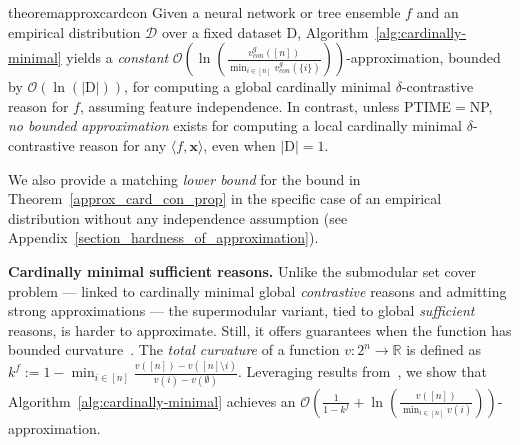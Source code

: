 \documentclass{article}
\newtheorem{theorem}{Theorem}
\newcommand{\x}{\textbf{x}}
\begin{document}


\begin{restatable}{theorem}{approxcardcon}\label{approx_card_con_prop}
Given a neural network or tree ensemble $f$ and an empirical distribution $\mathcal{D}$ over a fixed dataset $\text{D}$, Algorithm~\ref{alg:cardinally-minimal} yields a \emph{constant} $\mathcal{O}\left(\ln\left(\frac{v^g_{con}([n])}{\min_{i \in [n]} v^g_{con}(\{i\})}\right)\right)$-approximation, bounded by $\mathcal{O}(\ln(|\text{D}|))$, for computing a global cardinally minimal $\delta$-contrastive reason for $f$, assuming feature independence. In contrast, unless PTIME$=$NP, \emph{no bounded approximation} exists for computing a local cardinally minimal $\delta$-contrastive reason for any $\langle f,\x\rangle$, even when $|\text{D}| = 1$.
\end{restatable}

We also provide a matching \emph{lower bound} for the bound in Theorem~\ref{approx_card_con_prop} in the specific case of an empirical distribution without any independence assumption (see Appendix~\ref{section_hardness_of_approximation}).

\textbf{Cardinally minimal sufficient reasons.} Unlike the submodular set cover problem --- linked to cardinally minimal global \emph{contrastive} reasons and admitting strong approximations --- the supermodular variant, tied to global \emph{sufficient} reasons, is harder to approximate. Still, it offers guarantees when the function has bounded curvature~\citep{shi2021minimum}. The \emph{total curvature} of a function $v:2^{n}\to \mathbb{R}$ is defined as $k^f := 1 - \min_{i \in [n]} \frac{v([n]) - v([n] \setminus {i})}{v({i}) - v(\emptyset)}$. Leveraging results from~\cite{shi2021minimum}, we show that Algorithm~\ref{alg:cardinally-minimal} achieves an $\mathcal{O}\left(\frac{1}{1 - k^f} + \ln\left(\frac{v([n])}{\min_{i \in [n]} v({i})}\right)\right)$-approximation.


\end{document}
